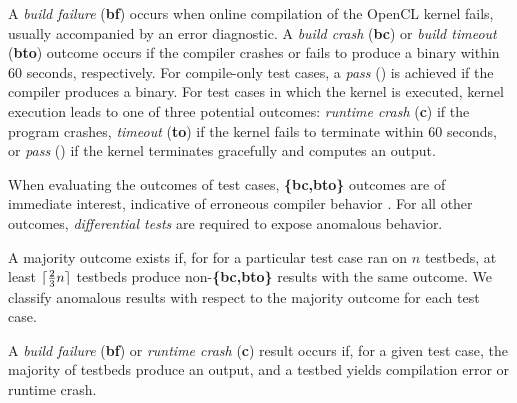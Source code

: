 A \emph{build failure} (\textbf{bf}) occurs when online compilation of the OpenCL kernel fails, usually accompanied by an error diagnostic. A \emph{build crash} (\textbf{bc}) or \emph{build timeout} (\textbf{bto}) outcome occurs if the compiler crashes or fails to produce a binary within 60 seconds, respectively. For compile-only test cases, a \emph{pass} (\textbf{\cmark}) is achieved if the compiler produces a binary. For test cases in which the kernel is executed, kernel execution leads to one of three potential outcomes: \emph{runtime crash} (\textbf{c}) if the program crashes, \emph{timeout} (\textbf{to}) if the kernel fails to terminate within 60 seconds, or \emph{pass} (\textbf{\cmark}) if the kernel terminates gracefully and computes an output.
%

When evaluating the outcomes of test cases, \textbf{\{bc,bto\}} outcomes are of immediate interest, indicative of erroneous compiler behavior . For all other outcomes, \emph{differential tests} are required to expose anomalous behavior.

A majority outcome exists if, for for a particular test case ran on $n$ testbeds, at least $\lceil\frac{2}{3}n\rceil$ testbeds produce non-\textbf{\{bc,bto\}} results with the same outcome. We classify anomalous results with respect to the majority outcome for each test case.

A \emph{build failure} (\textbf{bf}) or \emph{runtime crash} (\textbf{c}) result occurs if, for a given test case, the majority of testbeds produce an output, and a testbed yields compilation error or runtime crash.

